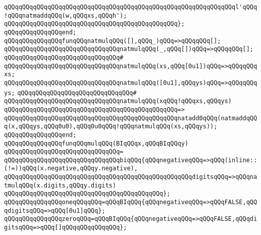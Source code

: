 \newline
\verb|qQQqqQQqqQQqqQQqqQQqqQQqqQQqqQQqqQQqqQQqqQQqqQQqqQQqqQQqqQQqqQQql'qQQq!qQQqnatmaddqQQq(w,qQQqxs,qQQqh');|\newline
\verb|qQQqqQQqqQQqqQQqqQQqqQQqqQQqqQQqqQQqqQQqqQQqqQQq};|\newline
\verb|qQQqqQQqqQQqqQQqend;|\newline
\newline
\verb|qQQqqQQqqQQqqQQqfunqQQqnatmulqQQq([],qQQq_)qQQq=>qQQqqQQq[];|\newline
\verb|qQQqqQQqqQQqqQQqqQQqqQQqqQQqqQQqnatmulqQQq(_,qQQq[])qQQq=>qQQqqQQq[];|\newline
\verb|qQQqqQQqqQQqqQQqqQQqqQQqqQQqqQQq#|\newline
\verb|qQQqqQQqqQQqqQQqqQQqqQQqqQQqqQQqnatmulqQQq(xs,qQQq[0u1])qQQq=>qQQqqQQqxs;|\newline
\verb|qQQqqQQqqQQqqQQqqQQqqQQqqQQqqQQqnatmulqQQq([0u1],qQQqys)qQQq=>qQQqqQQqys;|\newline
\verb|qQQqqQQqqQQqqQQqqQQqqQQqqQQqqQQq#|\newline
\verb|qQQqqQQqqQQqqQQqqQQqqQQqqQQqqQQqnatmulqQQq(xqQQq!qQQqxs,qQQqys)|\newline
\verb|qQQqqQQqqQQqqQQqqQQqqQQqqQQqqQQqqQQqqQQqqQQqqQQq=>|\newline
\verb|qQQqqQQqqQQqqQQqqQQqqQQqqQQqqQQqqQQqqQQqqQQqqQQqnatadd0qQQq(natmaddqQQq(x,qQQqys,qQQq0u0),qQQq0u0qQQq!qQQqnatmulqQQq(xs,qQQqys));|\newline
\verb|qQQqqQQqqQQqqQQqend;|\newline
\newline
\verb|qQQqqQQqqQQqqQQqfunqQQqmulqQQq(BIqQQqx,qQQqBIqQQqy)|\newline
\verb|qQQqqQQqqQQqqQQqqQQqqQQqqQQqqQQq=|\newline
\verb|qQQqqQQqqQQqqQQqqQQqqQQqqQQqqQQqbiqQQq{qQQqnegativeqQQq=>qQQq(inline::(!=))qQQq(x.negative,qQQqy.negative),|\newline
\verb|qQQqqQQqqQQqqQQqqQQqqQQqqQQqqQQqqQQqqQQqqQQqqQQqqQQqdigitsqQQq=>qQQqnatmulqQQq(x.digits,qQQqy.digits)|\newline
\verb|qQQqqQQqqQQqqQQqqQQqqQQqqQQqqQQqqQQqqQQqqQQq};|\newline
\newline
\verb|qQQqqQQqqQQqqQQqoneqQQqqQQq=qQQqBIqQQq{qQQqnegativeqQQq=>qQQqFALSE,qQQqdigitsqQQq=>qQQq[0u1]qQQq};|\newline
\verb|qQQqqQQqqQQqqQQqzeroqQQq=qQQqBIqQQq{qQQqnegativeqQQq=>qQQqFALSE,qQQqdigitsqQQq=>qQQq[]qQQqqQQqqQQqqQQq};|\newline
